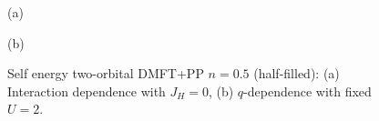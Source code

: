 \begin{figure}[h!]
\begin{minipage}[h]{0.5\linewidth}
 (a) \\
\end{minipage}
\hfill
\begin{minipage}[h]{0.5\linewidth}
 (b) \\
\end{minipage}

\caption{Self energy two-orbital DMFT+PP $n=0.5$ (half-filled): (a) Interaction dependence with $J_{H}=0$, (b) $q$-dependence with fixed $U=2$.}
\label{fig:2_orb_Sigma_pp_mu0_eq}
\end{figure}

